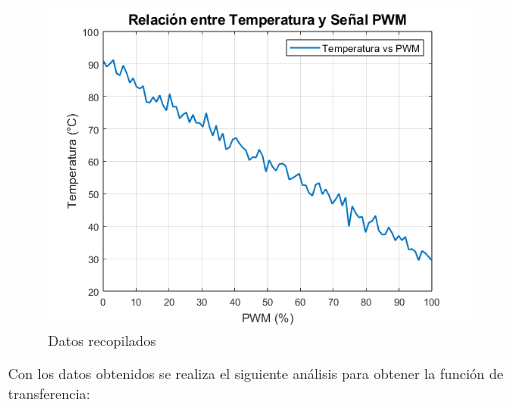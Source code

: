 \documentclass[12pt]{article}
\begin{document}
		\begin{figure}
		
			\label{fig:pwmvstemp}
			\includegraphics[width=1\linewidth]{Imagenes/pwm_vs_temp}
			\caption[Datos recopilados]{Datos recopilados}
		\end{figure}
		
		Con los datos obtenidos se realiza el siguiente análisis para obtener la función de transferencia:
		
\end{document}
